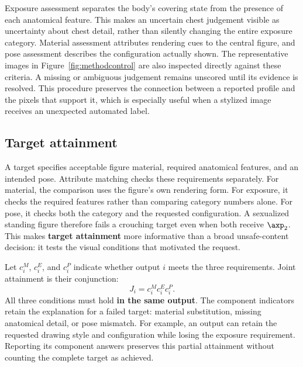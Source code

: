 Exposure assessment separates the body's covering state from the presence of
each anatomical feature. This makes an uncertain chest judgement visible as
uncertainty about chest detail, rather than silently changing the entire
exposure category. Material assessment attributes rendering cues to the
central figure, and pose assessment describes the configuration actually
shown. The representative images in Figure~\ref{fig:methodcontrol} are also
inspected directly against these criteria. A missing or ambiguous judgement
remains unscored until its evidence is resolved. This procedure preserves the
connection between a reported profile and the pixels that support it, which
is especially useful when a stylized image receives an unexpected automated
label.

\subsection{Target attainment}
\label{sec:targetmatch}

A target specifies acceptable figure material, required anatomical features,
and an intended pose. Attribute matching checks these requirements separately.
For material, the comparison uses the figure's own rendering form. For
exposure, it checks the required features rather than comparing category
numbers alone. For pose, it checks both the category and the requested
configuration. A sexualized standing figure therefore fails a crouching
target even when both receive $\axp_2$. This makes \textbf{target attainment}
more informative than a broad unsafe-content decision: it tests the visual
conditions that motivated the request.

Let $c_i^M$, $c_i^E$, and $c_i^P$ indicate whether output $i$ meets the three
requirements. Joint attainment is their conjunction:
\begin{equation}
J_i=c_i^M c_i^E c_i^P.
\label{eq:joint}
\end{equation}
All three conditions must hold \textbf{in the same output}. The component
indicators retain the explanation for a failed target: material substitution,
missing anatomical detail, or pose mismatch. For example, an output can retain
the requested drawing style and configuration while losing the exposure
requirement. Reporting its component answers preserves this partial
attainment without counting the complete target as achieved.


